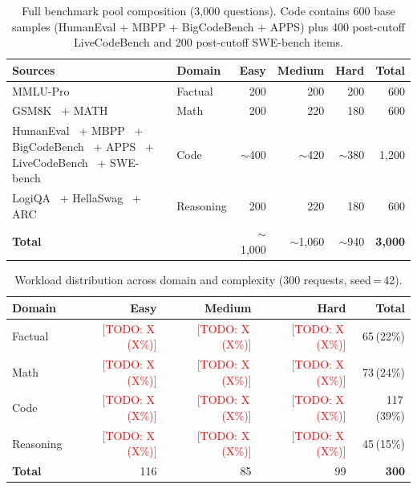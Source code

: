 \documentclass[11pt]{article}
\newcommand{\todo}[1]{\textcolor{red}{[TODO: #1]}}
\begin{document}
\begin{table}[t]
  \centering
  \caption{%
    Full benchmark pool composition (3{,}000 questions).
    Code contains 600 base samples (HumanEval + MBPP + BigCodeBench + APPS)
    plus 400 post-cutoff LiveCodeBench and 200 post-cutoff SWE-bench items.%
  }
  \label{tab:dataset}
  \small
  \begin{tabular}{llrrr|r}
    \toprule
    Sources & Domain & Easy & Medium & Hard & Total \\
    \midrule
    MMLU-Pro~\cite{wang2024mmlu}
      & Factual   & 200 & 200 & 200 & 600 \\
    GSM8K~\cite{cobbe2021gsm8k} + MATH~\cite{hendrycks2021math}
      & Math      & 200 & 220 & 180 & 600 \\
    HumanEval~\cite{chen2021humaneval} + MBPP~\cite{austin2021mbpp} +
      BigCodeBench~\cite{zhuo2024bigcodebench} + APPS~\cite{hendrycks2021apps} +
      LiveCodeBench~\cite{jain2024livecodebench} + SWE-bench~\cite{jimenez2024swebench}
      & Code      & $\sim$400 & $\sim$420 & $\sim$380 & 1{,}200 \\
    LogiQA~\cite{liu2020logiqa} + HellaSwag~\cite{zellers2019hellaswag} +
      ARC~\cite{clark2018arc}
      & Reasoning & 200 & 220 & 180 & 600 \\
    \midrule
    \textbf{Total} & & $\sim$1{,}000 & $\sim$1{,}060 & $\sim$940 & \textbf{3{,}000} \\
    \bottomrule
  \end{tabular}
\end{table}

\begin{table}[t]
  \centering
  \caption{Workload distribution across domain and complexity (300 requests, seed\,=\,42).}
  \label{tab:workload}
  \small
  \begin{tabular}{lrrr|r}
    \toprule
    Domain & Easy & Medium & Hard & Total \\
    \midrule
    Factual   & \todo{X\,(X\%)} & \todo{X\,(X\%)} & \todo{X\,(X\%)} & 65\,(22\%) \\
    Math      & \todo{X\,(X\%)} & \todo{X\,(X\%)} & \todo{X\,(X\%)} & 73\,(24\%) \\
    Code      & \todo{X\,(X\%)} & \todo{X\,(X\%)} & \todo{X\,(X\%)} & 117\,(39\%) \\
    Reasoning & \todo{X\,(X\%)} & \todo{X\,(X\%)} & \todo{X\,(X\%)} & 45\,(15\%) \\
    \midrule
    \textbf{Total} & 116 & 85 & 99 & \textbf{300} \\
    \bottomrule
  \end{tabular}
\end{table}
\end{document}
